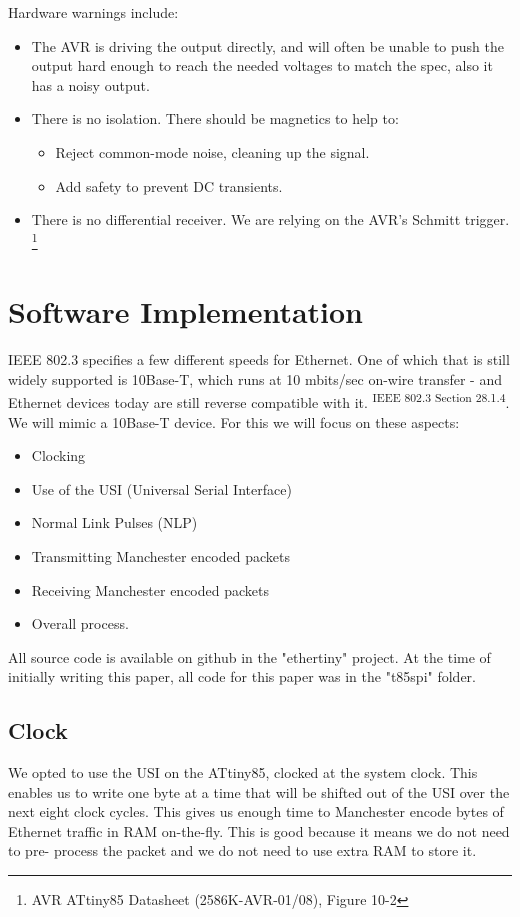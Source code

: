 \documentclass[13pt]{ltxdoc}
\begin{document}
Hardware warnings include:
\begin{itemize}
\item The AVR is driving the output directly, and will often be unable to push the output hard enough to reach the needed voltages to match the spec, also it has a noisy output.
\item There is no isolation.  There should be magnetics to help to:
\begin{itemize}
\item Reject common-mode noise, cleaning up the signal.
\item Add safety to prevent DC transients.
\end{itemize}
\item There is no differential receiver. We are relying on the AVR's Schmitt trigger. \footnote{AVR ATtiny85 Datasheet (2586K-AVR-01/08), Figure 10-2}
\end{itemize}

\section{Software Implementation}
IEEE 802.3 specifies a few different speeds for Ethernet.  One of which that is still
widely supported is 10Base-T, which runs at 10 mbits/sec on-wire transfer - and Ethernet
devices today are still reverse compatible with it.
\textsuperscript{IEEE 802.3 Section 28.1.4}.  We will
mimic a 10Base-T device.  For this we will focus on these aspects:

\begin{itemize}
\item Clocking
\item Use of the USI (Universal Serial Interface)
\item Normal Link Pulses (NLP)
\item Transmitting Manchester encoded packets
\item Receiving Manchester encoded packets
\item Overall process.
\end{itemize}

All source code is available on github in the "ethertiny" project.  At the time
of initially writing this paper, all code for this paper was in the "t85spi" folder.

\subsection{Clock}
We opted to
use the USI on the ATtiny85, clocked at the system clock.  This enables us to
write one byte at a time that will be shifted out of the USI over the next eight
clock cycles.  This gives us enough time to Manchester encode bytes of Ethernet
traffic in RAM on-the-fly.  This is good because it means we do not need to pre-
process the packet and we do not need to use extra RAM to store it.
\end{document}
